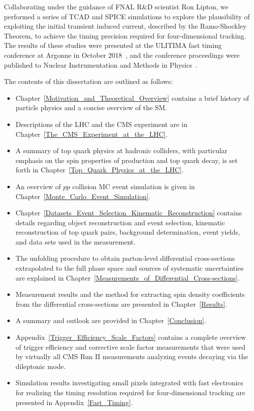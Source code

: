 Collaborating under the guidance of FNAL R\&D scientist Ron Lipton, we performed a series of TCAD and SPICE simulations to explore the plausibility of exploiting the initial transient induced current, described by the Ramo-Shockley Theorem, to achieve the timing precision required for four-dimensional tracking.
The results of these studies were presented at the ULITIMA fast timing conference at Argonne in October 2018~\cite{ULITIMA2018}, and the conference proceedings were published to Nuclear Instrumentation and Methods in Physics~\cite{LIPTON2019162423}.

The contents of this dissertation are outlined as follows:
\begin{itemize}
    \item Chapter~\ref{Motivation_and_Theoretical_Overview} contains a brief history of particle physics and a concise overview of the SM.
    \item Descriptions of the LHC and the CMS experiment are in Chapter~\ref{The_CMS_Experiment_at_the_LHC}.
    \item A summary of top quark physics at hadronic colliders, with particular emphasis on the spin properties of \ttbar production and top quark decay, is set forth in Chapter~\ref{Top_Quark_Physics_at_the_LHC}. 
    \item An overview of $pp$ collision MC event simulation is given in Chapter~\ref{Monte_Carlo_Event_Simulation}.
    \item Chapter~\ref{Datasets_Event_Selection_Kinematic_Reconstruction} contains details regarding object reconstruction and event selection, kinematic reconstruction of top quark pairs, background determination, event yields, and data sets used in the measurement.
    \item The unfolding procedure to obtain parton-level differential cross-sections extrapolated to the full phase space and sources of systematic uncertainties are explained in Chapter~\ref{Measurements_of_Differential_Cross-sections}.
    \item Measurement results and the method for extracting spin density coefficients from the differential cross-sections are presented in Chapter~\ref{Results}.
    \item A summary and outlook are provided in Chapter~\ref{Conclusion}.
    \item Appendix~\ref{Trigger_Efficiency_Scale_Factors} contains a complete overview of trigger efficiency and corrective scale factor measurements that were used by virtually all CMS Run II measurements analyzing \ttbar events decaying via the dileptonic mode.
    \item Simulation results investigating small pixels integrated with fast electronics for realizing the timing resolution required for four-dimensional tracking are presented in Appendix~\ref{Fast_Timing}.
\end{itemize}


\printbibliography[segment=\therefsegment,heading=subbibliography]
